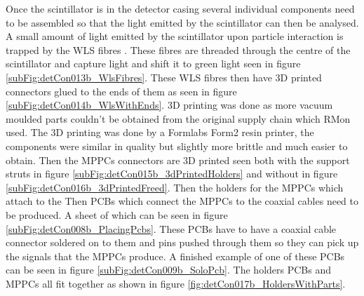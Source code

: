 Once the scintillator is in the detector casing several individual components need to be assembled so that the light emitted by the scintillator can then be analysed. A small amount of light emitted by the scintillator upon particle interaction is trapped by the WLS fibres . These fibres are threaded through the centre of the scintillator and capture light and shift it to green light seen in figure \ref{subFig:detCon013b_WlsFibres}. These WLS fibres then have 3D printed connectors glued to the ends of them as seen in figure \ref{subFig:detCon014b_WlsWithEnds}. 3D printing was done as more vacuum moulded parts couldn't be obtained from the original supply chain which RMon used. The 3D printing was done by a Formlabs Form2 resin printer, the components were similar in quality but slightly more brittle and much easier to obtain. Then the MPPCs connectors are 3D printed seen both with the support struts in figure \ref{subFig:detCon015b_3dPrintedHolders} and without in figure \ref{subFig:detCon016b_3dPrintedFreed}. Then the holders for the MPPCs which attach to the Then PCBs which connect the MPPCs to the coaxial cables need to be produced. A sheet of which can be seen in figure \ref{subFig:detCon008b_PlacingPcbs}. These PCBs have to have a coaxial cable connector soldered on to them and pins pushed through them so they can pick up the signals that the MPPCs produce. A finished example of one of these PCBs can be seen in figure \ref{subFig:detCon009b_SoloPcb}. The holders PCBs and MPPCs all fit together as shown in figure \ref{fig:detCon017b_HoldersWithParts}.

